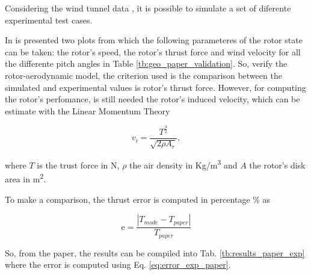 Considering the wind tunnel data \cite{brindejonc_design_2007}, it is possible to simulate a set of diferente experimental test cases. {In \cite{brindejonc_design_2007} is presented two plots from which the following parameteres of the rotor state can be taken: the rotor's speed, the rotor's thrust force and wind velocity for all the differente pitch angles in Table \ref{tb:geo_paper_validation}. So, verify the rotor-aerodynamic model, the criterion used is the comparison between the simulated and experimental values is rotor's thrust force. However, for computing the rotor's perfomance, is still needed the rotor's induced velocity, which can be estimate with the Linear Momentum Theory \cite{leishman_principles_2006}

\begin{equation}
    v_i = \frac{T ^ {\frac{3}{2}}}{\sqrt{2 \rho A_r }},
\end{equation}

where $T$ is the trust force in \unit{N}, $\rho$ the air density in \unit{Kg/m^3} and $A$ the rotor's disk area in \unit{m^2}. 

To make a comparison, the thrust error is computed in percentage \unit{\%} as

\begin{equation}
    \mathrm{e} =\frac{|T_{mode} - T_{paper}|}{T_{paper}}
    \label{eq:error_exp_paper}
\end{equation}

So, from the paper, the results can be compiled into Tab. \ref{tb:results_paper_exp} where the error is computed using Eq. \ref{eq:error_exp_paper}.


}
